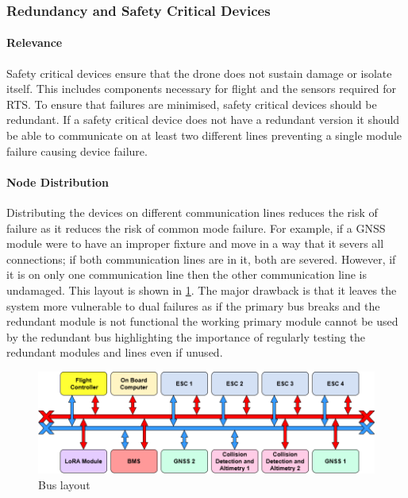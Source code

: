 \subsubsection{Redundancy and Safety Critical Devices}
\paragraph{Relevance}
Safety critical devices ensure that the drone does not sustain damage or isolate itself. This includes components necessary for flight and the sensors required for \gls{RTS}. To ensure that failures are minimised, safety critical devices should be redundant. If a safety critical device does not have a redundant version it should be able to communicate on at least two different lines preventing a single module failure causing device failure.
\paragraph{Node Distribution}
Distributing the devices on different communication lines reduces the risk of failure as it reduces the risk of common mode failure. For example, if a \gls{GNSS} module were to have an improper fixture and move in a way that it severs all connections; if both communication lines are in it, both are severed. However, if it is on only one communication line then the other communication line is undamaged. This layout is shown in \ref{fig:CAN_bus}. The major drawback is that it leaves the system more vulnerable to dual failures as if the primary bus breaks and the redundant module is not functional the working primary module cannot be used by the redundant bus highlighting the importance of regularly testing the redundant modules and lines even if unused.
 \begin{figure}[h!]
 \centering
  \includegraphics[width=1\textwidth]{figs/Thomas/Intra Communication/CAN bus.png}
 \caption{Bus layout}
 \label{fig:CAN_bus}
 \end{figure}
